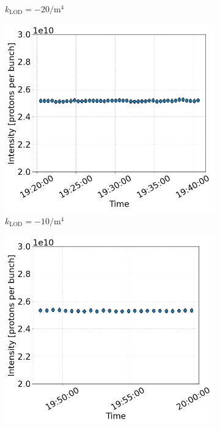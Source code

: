 \begin{figure}[htp]
\begin{subfigure}{.4\textwidth}
        \caption{$k_\mathrm{LOD}=-20 \mathrm{/m^{4}}$}
    \end{subfigure}
    \begin{subfigure}{.4\textwidth}
        \centering
        \includegraphics[width=.95\linewidth]{images/app_e/intensity_cc_md_12Sep22_coast_8.png}  
        \caption{$k_\mathrm{LOD}=-10 \mathrm{/m^{4}}$}
    \end{subfigure}
    \begin{subfigure}{.4\textwidth}
            \centering
            \includegraphics[width=.95\linewidth]{images/app_e/intensity_cc_md_12Sep22_coast_9.png}  

\end{subfigure}
\end{figure}
